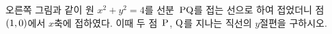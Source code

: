 \noindent\begin{minipage}[t]{0.58\linewidth}\vspace{0pt}\raggedright 오른쪽 그림과 같이 원 $x^2+y^2=4$를 선분~$\mathrm{PQ}$를 접는 선으로 하여 접었더니 점~$(1{,}\mkern3mu\mathopen{}0)$에서 $x$축에 접하였다. 이때 두 점~$\mathrm{P}$, $\mathrm{Q}$를 지나는 직선의 $y$절편을 구하시오. \end{minipage}\hfill\begin{minipage}[t]{0.4\linewidth}\vspace{0pt}\centering \resizebox{\ifdim\width>\linewidth\linewidth\else\width\fi}{!}{}\end{minipage}\par
